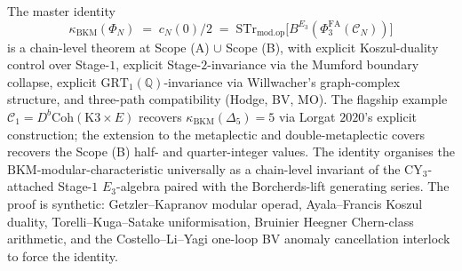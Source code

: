 \documentclass[11pt]{amsart}
\providecommand{\Q}{\mathbb{Q}}
\providecommand{\cC}{\mathcal{C}}
\providecommand{\GRT}{\mathrm{GRT}}
\providecommand{\PhiFA}{\Phi^{\mathrm{FA}}}
\providecommand{\Coh}{\mathrm{Coh}}
\providecommand{\STr}{\mathrm{STr}}
\providecommand{\modop}{\mathrm{mod.op}}
\providecommand{\kBKM}{\kappa_{\mathrm{BKM}}}
\begin{document}
The master identity
\[
 \kBKM(\Phi_N) \;=\; c_N(0)/2 \;=\;
 \STr_{\modop}\bigl[B^{E_3}(\PhiFA_3(\cC_N))\bigr]
\]
is a chain-level theorem at Scope (A) $\cup$ Scope (B), with explicit
Koszul-duality control over Stage-$1$, explicit Stage-$2$-invariance
via the Mumford boundary collapse, explicit $\GRT_1(\Q)$-invariance
via Willwacher's graph-complex structure, and three-path
compatibility (Hodge, BV, MO). The flagship example $\cC_1 =
D^b\Coh(\mathrm{K3} \times E)$ recovers $\kBKM(\Delta_5) = 5$ via
Lorgat $2020$'s explicit construction; the extension to the metaplectic
and double-metaplectic covers recovers the Scope (B) half- and
quarter-integer values. The identity organises the
$\mathrm{BKM}$-modular-characteristic universally as a chain-level
invariant of the CY$_3$-attached Stage-$1$ $E_3$-algebra paired with
the Borcherds-lift generating series. The proof is synthetic:
Getzler--Kapranov modular operad, Ayala--Francis Koszul duality,
Torelli--Kuga--Satake uniformisation, Bruinier Heegner Chern-class
arithmetic, and the Costello--Li--Yagi one-loop BV anomaly cancellation
interlock to force the identity.
\end{document}
